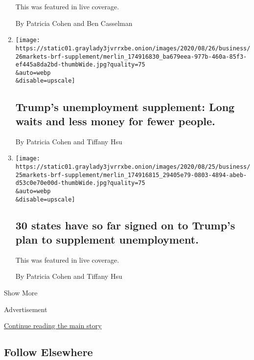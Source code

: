 \begin{enumerate}
  This was featured in live coverage.

  By Patricia Cohen and Ben Casselman
\item
  \href{/2020/08/26/business/trumps-unemployment-supplement-long-waits-and-less-money-for-fewer-people.html}{}

  \texttt{[image: https://static01.graylady3jvrrxbe.onion/images/2020/08/26/business/26markets-brf-supplement/merlin\_174916830\_ba679eea-977b-460a-85f3-ef445a8da2bd-thumbWide.jpg?quality=75\\\&auto=webp\\\&disable=upscale]}

  \hypertarget{trumps-unemployment-supplement-long-waits-and-less-money-for-fewer-people}{%
  \subsection{Trump's unemployment supplement: Long waits and less money
  for fewer
  people.}\label{trumps-unemployment-supplement-long-waits-and-less-money-for-fewer-people}}

  By Patricia Cohen and Tiffany Hsu
\item
  \href{/live/2020/08/25/business/stock-market-today-coronavirus/30-states-have-so-far-signed-on-to-trumps-plan-to-supplement-unemployment}{}

  \texttt{[image: https://static01.graylady3jvrrxbe.onion/images/2020/08/25/business/25markets-brf-supplement/merlin\_174916815\_29405e79-0803-4894-abeb-d53c0e70e00d-thumbWide.jpg?quality=75\\\&auto=webp\\\&disable=upscale]}

  \hypertarget{30-states-have-so-far-signed-on-to-trumps-plan-to-supplement-unemployment}{%
  \subsection{30 states have so far signed on to Trump's plan to
  supplement
  unemployment.}\label{30-states-have-so-far-signed-on-to-trumps-plan-to-supplement-unemployment}}

  This was featured in live coverage.

  By Patricia Cohen and Tiffany Hsu
\end{enumerate}

Show More

Advertisement

\protect\hyperlink{after-mid2}{Continue reading the main story}

\hypertarget{follow-elsewhere}{%
\subsection{Follow Elsewhere}\label{follow-elsewhere}}

